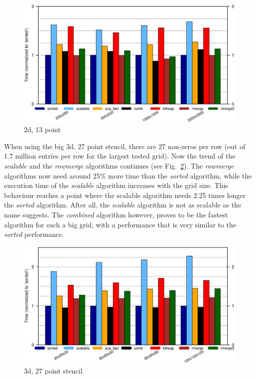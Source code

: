 \begin{figure}[tbp]
	\centering
	\includegraphics[width=1.1\textwidth, trim={0 7.3cm 0 1cm},clip]{seq_2d13point}
	\caption{2d, 13 point} 
	\label{fig:seq2d13point}
\end{figure}


When using the big 3d, 27 point stencil, there are 27 non-zeros per row (out of 1.7 million entries per row for the largest tested grid). Now the trend of the \textit{scalable} and the \textit{rowmerge} algorithms continues (see Fig.~\ref{fig:seq3d27point}). The \textit{rowmerge} algorithms now need around 25\% more time than the \textit{sorted} algorithm, while the execution time of the \textit{scalable} algorithm increases with the grid size. This behaviour reaches a point where the scalable algorithm needs 2.25 times longer the \textit{sorted} algorithm. After all, the \textit{scalable} algorithm is not as scalable as the name suggests. The \textit{combined} algorithm however, proves to be the fastest algorithm for such a big grid, with a performance that is very similar to the \textit{sorted} performance. 

\begin{figure}[tbp]
	\centering
	\includegraphics[width=1.05\textwidth, trim={0 7.3cm 0 1cm},clip]{seq_3d27point}
	\caption{3d, 27 point stencil} 
	\label{fig:seq3d27point}
\end{figure}

